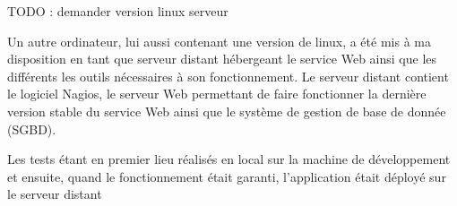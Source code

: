  TODO : demander version linux serveur

Un autre ordinateur, lui aussi contenant une version de linux, a \'et\'e mis \`a ma disposition en tant que serveur distant h\'ebergeant le service Web ainsi que les diff\'erents les outils n\'ecessaires \`a son fonctionnement.
Le serveur distant contient le logiciel Nagios, le serveur Web permettant de faire fonctionner la derni\`ere version stable du service Web ainsi que le syst\`eme de gestion de base de donn\'ee (SGBD).

Les tests \'etant en premier lieu r\'ealis\'es en local sur la machine de d\'eveloppement et ensuite, quand le fonctionnement \'etait garanti, l'application \'etait d\'eploy\'e sur le serveur distant



\clearpage
